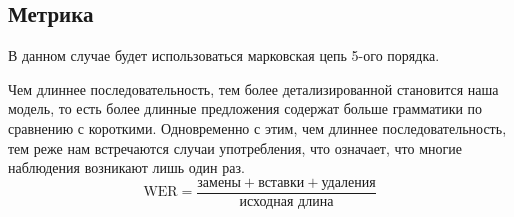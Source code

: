 \subsection{Метрика}

В данном случае будет использоваться марковская цепь 5-ого порядка.

Чем длиннее последовательность, тем более детализированной становится наша модель, то есть более длинные предложения содержат больше грамматики по сравнению с короткими. Одновременно с этим, чем длиннее последовательность, тем реже нам встречаются случаи употребления, что означает, что многие наблюдения возникают лишь один раз.
\begin{equation}
    \text{WER} = \dfrac{\text{замены}+\text{вставки}+\text{удаления}}{\text{исходная длина}}
\end{equation}
